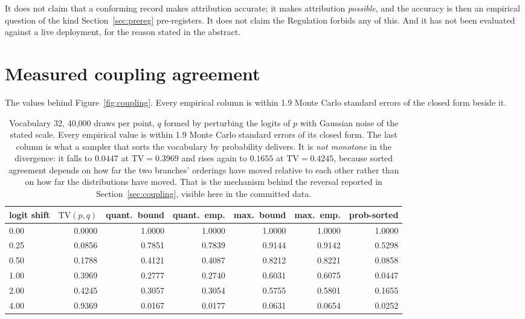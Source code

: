 \documentclass[11pt]{article}
\theoremstyle{remark}
\newcommand{\TV}{\mathrm{TV}}
\begin{document}
It does not claim that a conforming record makes attribution accurate; it makes
attribution \emph{possible}, and the accuracy is then an empirical question of the
kind Section~\ref{sec:prereg} pre-registers. It does not claim the Regulation
forbids any of this. And it has not been evaluated against a live deployment, for
the reason stated in the abstract.


\section{Measured coupling agreement}
\label{app:coupling-table}

The values behind Figure~\ref{fig:coupling}. Every empirical column is within
1.9 Monte Carlo standard errors of the closed form beside it.

\begin{table}[h]
\centering
\small
\setlength{\tabcolsep}{5pt}
\begin{tabular}{lrrrrrr}
\toprule
logit shift & $\TV(p,q)$ & quant.\ bound & quant.\ emp. & max.\ bound &
max.\ emp. & prob-sorted \\
\midrule
0.00 & 0.0000 & 1.0000 & 1.0000 & 1.0000 & 1.0000 & 1.0000 \\
0.25 & 0.0856 & 0.7851 & 0.7839 & 0.9144 & 0.9142 & 0.5298 \\
0.50 & 0.1788 & 0.4121 & 0.4087 & 0.8212 & 0.8221 & 0.0858 \\
1.00 & 0.3969 & 0.2777 & 0.2740 & 0.6031 & 0.6075 & 0.0447 \\
2.00 & 0.4245 & 0.3057 & 0.3054 & 0.5755 & 0.5801 & 0.1655 \\
4.00 & 0.9369 & 0.0167 & 0.0177 & 0.0631 & 0.0654 & 0.0252 \\
\bottomrule
\end{tabular}
\caption{Vocabulary 32, 40{,}000 draws per point, $q$ formed by perturbing the
logits of $p$ with Gaussian noise of the stated scale. Every empirical value is
within 1.9 Monte Carlo standard errors of its closed form. The last column is
what a sampler that sorts the vocabulary by probability delivers. It is
\emph{not monotone} in the divergence: it falls to $0.0447$ at $\TV = 0.3969$
and rises again to $0.1655$ at $\TV = 0.4245$, because sorted agreement depends
on how far the two branches' orderings have moved relative to each other rather
than on how far the distributions have moved. That is the mechanism behind the
reversal reported in Section~\ref{sec:coupling}, visible here in the committed
data.}
\label{tab:coupling}
\end{table}
\end{document}
